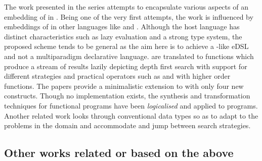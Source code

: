 \documentclass[thesis-solanki.tex]{subfiles}
\begin{document}
The work presented in the series
\cite{spivey1999embedding,seres1999algebra,seres2001higher,spivey1999algebra,seres2001algebra} attempts to
encapsulate various aspects of an embedding of  in .
Being one of the very first attempts, the work is influenced by embeddings of 
in other languages like  and .
Although the host language  has distinct characteristics such as lazy evaluation and a strong type system, the proposed
scheme tends to be general as the aim here is to achieve a -like eDSL and not a multiparadigm
declarative language.
  are translated to  functions which produce a
stream of results lazily depicting depth first search with support for different strategies and practical operators
such as  and  with higher order functions.
The papers provide a minimalistic extension to  with only four new constructs.
Though no implementation exists, the synthesis and transformation techniques for functional programs have been
\textit{logicalised} and applied to  programs.
Another related work \cite{spivey2000functional} looks through conventional data types so as to adapt to the
problems in the domain and accommodate and jump between search strategies.


\subsection{Other works related or based on the above}

\end{document}
